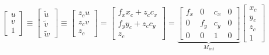 \begin{equation}
    \begin{bmatrix}
        u \\ v \\ 1
    \end{bmatrix}
    \equiv
    \begin{bmatrix}
        \widetilde{u} \\ \widetilde{v} \\ \widetilde{w}
    \end{bmatrix}
    \equiv
    \begin{bmatrix}
        z_c u \\ z_c v \\ z_c
    \end{bmatrix}
    =
    \begin{bmatrix}
        f_x x_c + z_c c_x \\ f_y y_c + z_c c_y \\ z_c
    \end{bmatrix} 
    =
    \underbrace{
    \begin{bmatrix}
        f_x & 0   & c_x & 0 \\
        0   & f_y & c_y & 0 \\
        0   & 0   & 1   & 0
    \end{bmatrix}
    }_{M_{int}}
    \begin{bmatrix}
        x_c \\ y_c \\ z_c \\ 1
    \end{bmatrix}
\end{equation}

